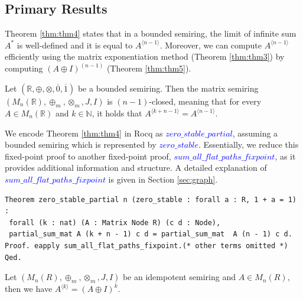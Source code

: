 \documentclass[a4paper,UKenglish,cleveref, autoref, thm-restate, anonymous]{lipics-v2021}
\begin{document}
\subsection{Primary Results} 
Theorem \ref{thm:thm4} states that in a bounded semiring, 
the limit of infinite sum $A^{*}$ is well-defined  and it is equal to $A^{\langle n - 1 \rangle}$.
Moreover, we can compute  $A^{\langle n - 1 \rangle}$ efficiently using the 
matrix exponentiation method (Theorem \ref{thm:thm3}) by computing 
$(A \oplus I)^{(n - 1)}$ (Theorem \ref{thm:thm5}).



\begin{theorem}\label{thm:thm4}
Let \( (\mathbb{R}, \oplus, \otimes, \overline{0}, \overline{1}) \) be a bounded semiring. Then the matrix semiring \( (M_{n}(\mathbb{R}), \oplus_{m}, \otimes_{m}, J, I) \) is \((n-1)\)-closed, meaning that for every \( A \in M_{n}(\mathbb{R}) \) and \( k \in \mathbb{N} \), it holds that \( A^{\langle k + n - 1 \rangle} = A^{\langle n - 1 \rangle} \).


\end{theorem}

We encode Theorem \ref{thm:thm4} in Rocq as \textcolor{blue}{$zero\_stable\_partial$}, assuming a bounded semiring which is represented by \textcolor{blue}{$zero\_stable$}. Essentially, we reduce this fixed-point proof to another fixed-point proof, \textcolor{blue}{$sum\_all\_flat\_paths\_fixpoint$}, as it provides additional information and structure. A detailed explanation of \textcolor{blue}{$sum\_all\_flat\_paths\_fixpoint$} is given in Section \ref{sec:graph}.





\begin{lstlisting}[language=Coq]
Theorem zero_stable_partial n (zero_stable : forall a : R, 1 + a = 1) : 
 forall (k : nat) (A : Matrix Node R) (c d : Node),   
 partial_sum_mat A (k + n - 1) c d = partial_sum_mat  A (n - 1) c d.
Proof. eapply sum_all_flat_paths_fixpoint.(* other terms omitted *) Qed.
\end{lstlisting}

\begin{theorem}\label{thm:thm3}
    Let \((M_{n}(R),  \oplus_{m}, \otimes_{m}, J, I)\) be an idempotent 
    semiring and $A \in M_{n}(R)$, 
    then we have  $A^{\langle k \rangle} = (A \oplus I)^k$.
\end{theorem}
\end{document}
